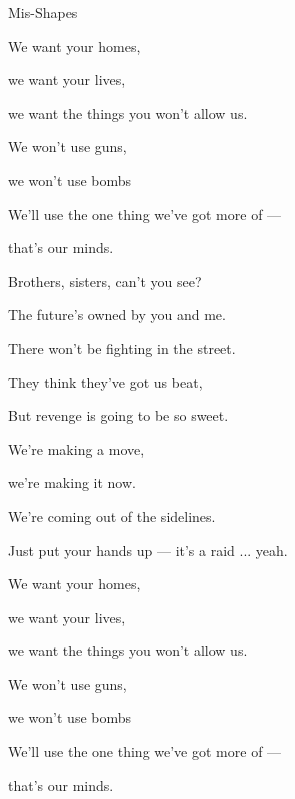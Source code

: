 \begin{song}{Mis-Shapes}{

    \chordset[Verse]{ \AMaj \EMaj \Fshm \DMaj \DSeven}

    \chordset[Chorus]{ \GMaj \GMajSeven \GSeven \CMaj \CMajSeven \CSeven }
	
	\chordset{ \Em \EmSix \EmaddC }

}
\begin{songchorus}
		We want your homes,

		we want your lives,

		we want the things you won't allow us. 

		We won't use guns, 

		we won't use bombs

		We'll use the one thing we've got more of ---

		that's our minds.  \hspace{30pt}  \qquad {}

	\end{songchorus}

	\begin{songverse}
				Brothers, sisters, can't you see? 

		The future's owned by you and me. 

		There won't be fighting in the street. 

		They think they've got us beat, 

		But revenge is going to be so sweet. 
	\end{songverse}

	\begin{songchorus}		

		
		 \quad We're making a move, 

		we're making it now. 

		We're coming out of the sidelines. 

		\quad Just put your hands up --- it's a raid ... yeah.

		We want your homes,

		we want your lives,

		we want the things you won't allow us. 

		We won't use guns, 

		we won't use bombs

		We'll use the one thing we've got more of ---

		that's our minds.  \hspace{30pt}  \qquad {}

	 \end{songchorus}

\end{song}
